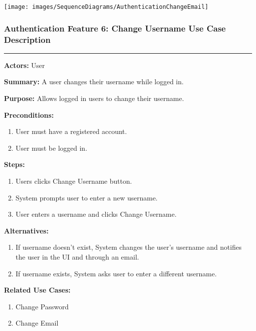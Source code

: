 \documentclass[twoside,letterpaper]{article}
\begin{document}
\bigskip

\texttt{[image: images/SequenceDiagrams/AuthenticationChangeEmail]}

\newpage

\subsubsection[Authentication Feature 6: Change Username Use Case Description] {\rmfamily\bfseries\color{black}
	Authentication Feature 6: Change Username Use Case Description}
\hypertarget{RefHeading22059017292}{}

\hrule
\vspace{8pt}
\noindent\textbf{Actors:} User \newline

\noindent\textbf{Summary:} A user changes their username while logged in.  \newline

\noindent\textbf{Purpose:} Allows logged in users to change their username.  \newline

\noindent\textbf{Preconditions:}
\begin{enumerate}
	\item User must have a registered account.
	\item User must be logged in.
\end{enumerate}

\noindent\textbf{Steps:}
\begin{enumerate}
	\item Users clicks Change Username button.
	\item System prompts user to enter a new username.
	\item User enters a username and clicks Change Username.
\end{enumerate}

\noindent\textbf{Alternatives:}
\begin{enumerate}
	\item If username doesn't exist, System changes the user's username and notifies the user in the UI and through an email.
	\item If username exists, System asks user to enter a different username.
\end{enumerate}

\noindent\textbf{Related Use Cases:}
\begin{enumerate}
	\item Change Password
	\item Change Email
\end{enumerate}
\end{document}
